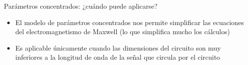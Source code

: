 \documentclass[aspectratio=169, xcolor={usenames,svgnames,dvipsnames}]{beamer}
\begin{document}

\begin{frame}{Parámetros concentrados: \hspace{5mm} ¿cuándo puede aplicarse?}

    \vspace{2mm}
    \begin{itemize}
        \item El modelo de parámetros concentrados nos permite simplificar las ecuaciones del electromagnetismo de Maxwell (lo que \alert{simplifica mucho los cálculos})
        \vspace{2mm}
        \item Es aplicable únicamente cuando \alert{las dimensiones del circuito son muy inferiores a la longitud de onda} de la señal que circula por el circuito
        \vspace{5mm}
    \end{itemize}


\end{frame}
\end{document}
